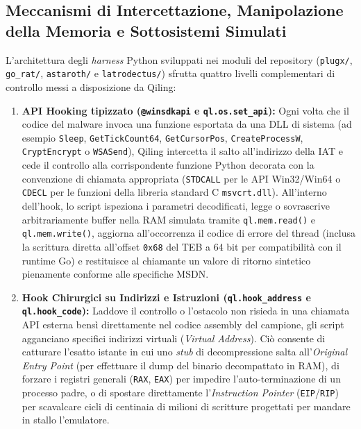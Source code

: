 \documentclass[11pt, a4paper]{article}
\begin{document}
\subsection{Meccanismi di Intercettazione, Manipolazione della Memoria e Sottosistemi Simulati}

L'architettura degli \textit{harness} Python sviluppati nei moduli del repository (\texttt{plugx/}, \texttt{go\_rat/}, \texttt{astaroth/} e \texttt{latrodectus/}) sfrutta quattro livelli complementari di controllo messi a disposizione da Qiling:

\begin{enumerate}
	\item \textbf{API Hooking tipizzato (\texttt{@winsdkapi} e \texttt{ql.\allowbreak{}os.\allowbreak{}set\_\allowbreak{}api}):} Ogni volta che il codice del malware invoca una funzione esportata da una DLL di sistema (ad esempio \texttt{Sleep}, \texttt{Get\allowbreak{}Tick\allowbreak{}Count64}, \texttt{GetCursorPos}, \texttt{Create\allowbreak{}ProcessW}, \texttt{CryptEncrypt} o \texttt{WSASend}), Qiling intercetta il salto all'indirizzo della IAT e cede il controllo alla corrispondente funzione Python decorata con la convenzione di chiamata appropriata (\texttt{STDCALL} per le API Win32/Win64 o \texttt{CDECL} per le funzioni della libreria standard C \texttt{msvcrt.dll}). All'interno dell'hook, lo script ispeziona i parametri decodificati, legge o sovrascrive arbitrariamente buffer nella RAM simulata tramite \texttt{ql.\allowbreak{}mem.\allowbreak{}read()} e \texttt{ql.\allowbreak{}mem.\allowbreak{}write()}, aggiorna all'occorrenza il codice di errore del thread (inclusa la scrittura diretta all'offset \texttt{0x68} del TEB a 64 bit per compatibilit\`a con il runtime Go) e restituisce al chiamante un valore di ritorno sintetico pienamente conforme alle specifiche MSDN.
	
	\item \textbf{Hook Chirurgici su Indirizzi e Istruzioni (\texttt{ql.\allowbreak{}hook\_\allowbreak{}address} e \texttt{ql.\allowbreak{}hook\_\allowbreak{}code}):} Laddove il controllo o l'ostacolo non risieda in una chiamata API esterna bens\`i direttamente nel codice assembly del campione, gli script agganciano specifici indirizzi virtuali (\textit{Virtual Address}). Ci\`o consente di catturare l'esatto istante in cui uno \textit{stub} di decompressione salta all'\textit{Original Entry Point} (per effettuare il dump del binario decompattato in RAM), di forzare i registri generali (\texttt{RAX}, \texttt{EAX}) per impedire l'auto-terminazione di un processo padre, o di spostare direttamente l'\textit{Instruction Pointer} (\texttt{EIP}/\texttt{RIP}) per scavalcare cicli di centinaia di milioni di scritture progettati per mandare in stallo l'emulatore.
	

\end{enumerate}
\end{document}
